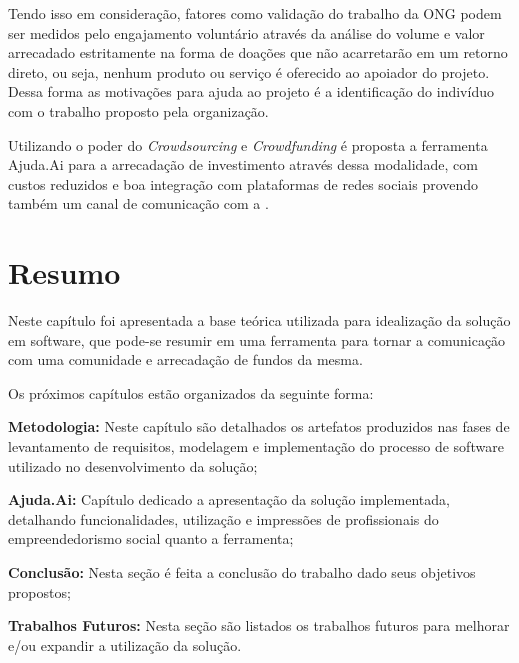Tendo isso em consideração, fatores como validação do trabalho da ONG podem ser medidos pelo engajamento voluntário através da análise do volume e valor arrecadado estritamente na forma de doações que não acarretarão em um retorno direto, ou seja, nenhum produto ou serviço é oferecido ao apoiador do projeto. Dessa forma as motivações para ajuda ao projeto é a identificação do indivíduo com o trabalho proposto pela organização.

Utilizando o poder do \emph{Crowdsourcing} e \emph{Crowdfunding} é proposta a ferramenta Ajuda.Ai para a arrecadação de investimento através dessa modalidade, com custos reduzidos e boa integração com plataformas de redes sociais provendo também um canal de comunicação com a .



\section*{Resumo}
Neste capítulo foi apresentada a base teórica utilizada para idealização da solução em software, que pode-se resumir em uma ferramenta para tornar a comunicação com uma comunidade e arrecadação de fundos da mesma.

Os próximos capítulos estão organizados da seguinte forma:

\begin{lista}
  \item \textbf{Metodologia:} Neste capítulo são detalhados os artefatos produzidos nas fases de levantamento de requisitos, modelagem e implementação do processo de software utilizado no desenvolvimento da solução;
  \item \textbf{Ajuda.Ai:} Capítulo dedicado a apresentação da solução implementada, detalhando funcionalidades, utilização e impressões de profissionais do empreendedorismo social quanto a ferramenta;
  \item \textbf{Conclusão:} Nesta seção é feita a conclusão do trabalho dado seus objetivos propostos;
  \item \textbf{Trabalhos Futuros:} Nesta seção são listados os trabalhos futuros para melhorar e/ou expandir a utilização da solução.
\end{lista}